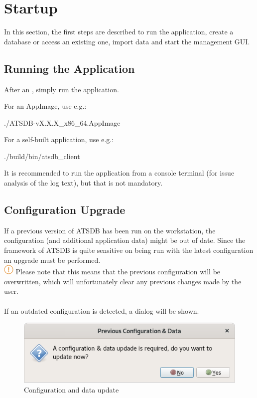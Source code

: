\chapter{Startup}
\label{sec:startup} 

In this section, the first steps are described to run the application, create a database or access an existing one, import data and start the management GUI.

\section{Running the Application}

After an , simply run the application.

For an AppImage, use e.g.:
\begin{cverbatim}
./ATSDB-vX.X.X_x86_64.AppImage
\end{cverbatim}

For a self-built application, use e.g.:
\begin{cverbatim}
./build/bin/atsdb_client
\end{cverbatim}

It is recommended to run the application from a console terminal (for issue analysis of the log text), but that is not mandatory.

\section{Configuration Upgrade}

If a previous version of ATSDB has been run on the workstation, the configuration (and additional application data) might be out of date. Since the framework of ATSDB is quite sensitive on being run with the latest configuration an upgrade must be performed. \\

\includegraphics[width=0.5cm]{../../data/icons/hint.png} Please note that this means that the previous configuration will be overwritten, which will unfortunately clear any previous changes made by the user. \\\\

If an outdated configuration is detected, a dialog will be shown.

\begin{figure}[H]
    \includegraphics[width=12cm,frame]{../screenshots/config_data_update.png}
  \caption{Configuration and data update}
  \label{fig:db_connect}
\end{figure}

